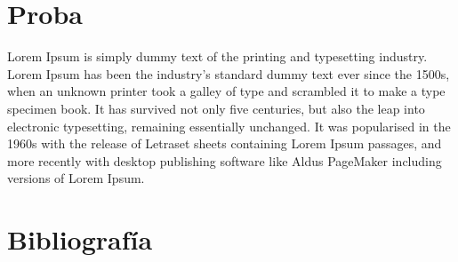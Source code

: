 \documentclass[12pt, a4paper, titlepage]{article}
\begin{document}
  \newpage
  \begin{appendices}
    \makeatletter

    \section{Proba}

    Lorem Ipsum is simply dummy text of the printing and typesetting industry. Lorem Ipsum has been the industry's standard dummy text ever since the 1500s, when an unknown printer took a galley of type and scrambled it to make a type specimen book. It has survived not only five centuries, but also the leap into electronic typesetting, remaining essentially unchanged. It was popularised in the 1960s with the release of Letraset sheets containing Lorem Ipsum passages, and more recently with desktop publishing software like Aldus PageMaker including versions of Lorem Ipsum.

    \section{Bibliografía}



  \end{appendices}
\end{document}
